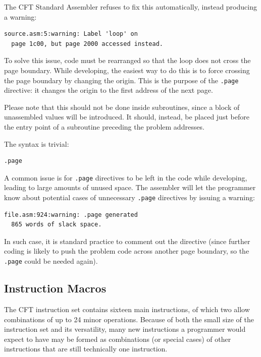 \documentclass[11pt,a4paper,twocolumns]{article}
\newcommand\f[1]{{\color{black}\texttt{#1}}}
\begin{document}
The CFT Standard Assembler refuses to fix this automatically, instead producing a warning:

\begin{verbatim}
source.asm:5:warning: Label 'loop' on
  page 1c00, but page 2000 accessed instead.
\end{verbatim}

To solve this issue, code must be rearranged so that the loop does not cross
the page boundary. While developing, the easiest way to do this is to force
crossing the page boundary by changing the origin. This is the purpose of the
\f{.page} directive: it changes the origin to the first address of the next
page.

Please note that this should not be done inside subroutines, since a block of
unassembled values will be introduced. It should, instead, be placed just
before the entry point of a subroutine preceding the problem addresses.

The syntax is trivial:

\begin{verbatim}
.page
\end{verbatim}

A common issue is for \f{.page} directives to be left in the code while
developing, leading to large amounts of unused space. The assembler will let
the programmer know about potential cases of unnecessary \f{.page} directives
by issuing a warning:

\begin{verbatim}
file.asm:924:warning: .page generated
  865 words of slack space.
\end{verbatim}

In such case, it is standard practice to comment out the directive (since
further coding is likely to push the problem code across another page boundary,
so the \f{.page} could be needed again).



\subsection{Instruction Macros}

The CFT instruction set contains sixteen main instructions, of which two allow
combinations of up to 24 minor operations. Because of both the small size of
the instruction set and its versatility, many new instructions a programmer
would expect to have may be formed as combinations (or special cases) of other
instructions that are still technically one instruction.
\end{document}

